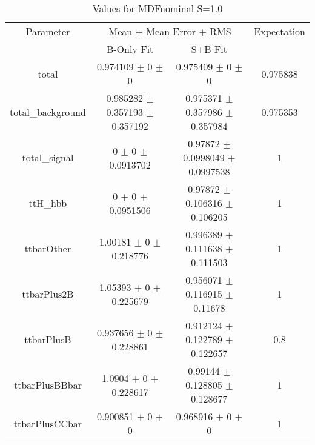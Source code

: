 \begin{table}
\centering
\caption{Values for MDFnominal S=1.0}
\begin{tabular}{cccc}
\toprule
Parameter & \multicolumn{2}{c}{Mean $\pm$ Mean Error $\pm$ RMS} & Expectation\\
 & B-Only Fit & S+B Fit & \\
\midrule
total & \num{0.974109} $\pm$ \num{0} $\pm$ \num{0} & \num{0.975409} $\pm$ \num{0} $\pm$ \num{0} & \num{0.975838}\\
total\_background & \num{0.985282} $\pm$ \num{0.357193} $\pm$ \num{0.357192} & \num{0.975371} $\pm$ \num{0.357986} $\pm$ \num{0.357984} & \num{0.975353}\\
total\_signal & \num{0} $\pm$ \num{0} $\pm$ \num{0.0913702} & \num{0.97872} $\pm$ \num{0.0998049} $\pm$ \num{0.0997538} & \num{1}\\
ttH\_hbb & \num{0} $\pm$ \num{0} $\pm$ \num{0.0951506} & \num{0.97872} $\pm$ \num{0.106316} $\pm$ \num{0.106205} & \num{1}\\
ttbarOther & \num{1.00181} $\pm$ \num{0} $\pm$ \num{0.218776} & \num{0.996389} $\pm$ \num{0.111638} $\pm$ \num{0.111503} & \num{1}\\
ttbarPlus2B & \num{1.05393} $\pm$ \num{0} $\pm$ \num{0.225679} & \num{0.956071} $\pm$ \num{0.116915} $\pm$ \num{0.11678} & \num{1}\\
ttbarPlusB & \num{0.937656} $\pm$ \num{0} $\pm$ \num{0.228861} & \num{0.912124} $\pm$ \num{0.122789} $\pm$ \num{0.122657} & \num{0.8}\\
ttbarPlusBBbar & \num{1.0904} $\pm$ \num{0} $\pm$ \num{0.228617} & \num{0.99144} $\pm$ \num{0.128805} $\pm$ \num{0.128677} & \num{1}\\
ttbarPlusCCbar & \num{0.900851} $\pm$ \num{0} $\pm$ \num{0} & \num{0.968916} $\pm$ \num{0} $\pm$ \num{0} & \num{1}\\
\bottomrule
\end{tabular}
\end{table}